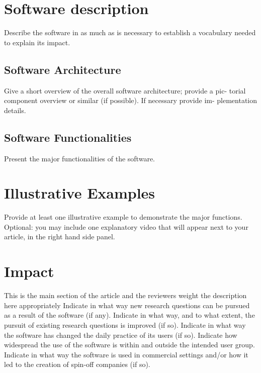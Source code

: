 \documentclass[]{elsarticle} %
\begin{document}
\hypertarget{software-description}{%
\section{Software description}\label{software-description}}

Describe the software in as much as is necessary to establish a
vocabulary needed to explain its impact.

\hypertarget{software-architecture}{%
\subsection{Software Architecture}\label{software-architecture}}

Give a short overview of the overall software architecture; provide a
pic- torial component overview or similar (if possible). If necessary
provide im- plementation details.

\hypertarget{software-functionalities}{%
\subsection{Software Functionalities}\label{software-functionalities}}

Present the major functionalities of the software.

\hypertarget{illustrative-examples}{%
\section{Illustrative Examples}\label{illustrative-examples}}

Provide at least one illustrative example to demonstrate the major
functions. Optional: you may include one explanatory video that will
appear next to your article, in the right hand side panel.

\hypertarget{impact}{%
\section{Impact}\label{impact}}

This is the main section of the article and the reviewers weight the
description here appropriately Indicate in what way new research
questions can be pursued as a result of the software (if any). Indicate
in what way, and to what extent, the pursuit of existing research
questions is improved (if so). Indicate in what way the software has
changed the daily practice of its users (if so). Indicate how widespread
the use of the software is within and outside the intended user group.
Indicate in what way the software is used in commercial settings and/or
how it led to the creation of spin-off companies (if so).
\end{document}
